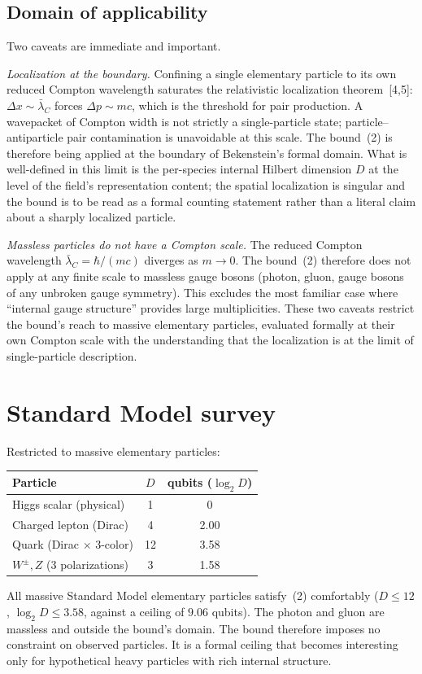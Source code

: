 \documentclass[11pt]{article}
\newcommand{\lbar}{\bar\lambda_{C}}
\begin{document}
\subsection{Domain of applicability}

Two caveats are immediate and important.

\textit{Localization at the boundary.} Confining a single elementary particle to its own reduced
Compton wavelength saturates the relativistic localization theorem~[4,5]: $\Delta x \sim \lbar$
forces $\Delta p \sim mc$, which is the threshold for pair production. A wavepacket of Compton width
is not strictly a single-particle state; particle--antiparticle pair contamination is unavoidable at
this scale. The bound~(2) is therefore being applied at the boundary of Bekenstein's formal domain.
What is well-defined in this limit is the per-species internal Hilbert dimension $D$ at the level of
the field's representation content; the spatial localization is singular and the bound is to be read
as a formal counting statement rather than a literal claim about a sharply localized particle.

\textit{Massless particles do not have a Compton scale.} The reduced Compton wavelength
$\lbar = \hbar/(mc)$ diverges as $m \to 0$. The bound~(2) therefore does not apply at any finite
scale to massless gauge bosons (photon, gluon, gauge bosons of any unbroken gauge symmetry). This
excludes the most familiar case where ``internal gauge structure'' provides large multiplicities.
These two caveats restrict the bound's reach to massive elementary particles, evaluated formally at
their own Compton scale with the understanding that the localization is at the limit of
single-particle description.

\section{Standard Model survey}

Restricted to massive elementary particles:
\begin{center}
\begin{tabular}{lcc}
\toprule
Particle & $D$ & qubits ($\log_{2} D$) \\
\midrule
Higgs scalar (physical) & 1 & 0 \\
Charged lepton (Dirac) & 4 & 2.00 \\
Quark (Dirac $\times$ 3-color) & 12 & 3.58 \\
$W^{\pm}, Z$ (3 polarizations) & 3 & 1.58 \\
\bottomrule
\end{tabular}
\end{center}
All massive Standard Model elementary particles satisfy~(2) comfortably ($D \le 12$,
$\log_{2} D \le 3.58$, against a ceiling of $9.06$ qubits). The photon and gluon are massless and
outside the bound's domain. The bound therefore imposes no constraint on observed particles. It is a
formal ceiling that becomes interesting only for hypothetical heavy particles with rich internal
structure.
\end{document}
